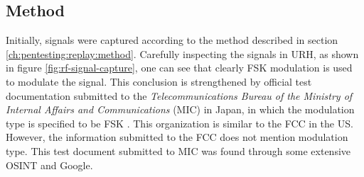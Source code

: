 \subsection{Method}
Initially, signals were captured according to the method described in section \ref{ch:pentesting:replay:method}. Carefully inspecting the signals in \gls{URH}, as shown in figure \ref{fig:rf-signal-capture}, one can see that clearly \gls{FSK} modulation is used to modulate the signal. This conclusion is strengthened by official test documentation submitted to the \textit{Telecommunications Bureau of the Ministry of Internal Affairs and Communications} (MIC) in Japan, in which the modulation type is specified to be FSK \cite{mic-test-report}. This organization is similar to the FCC in the US. However, the information submitted to the FCC does not mention modulation type. This test document submitted to MIC was found through some extensive \gls{OSINT} and Google.

